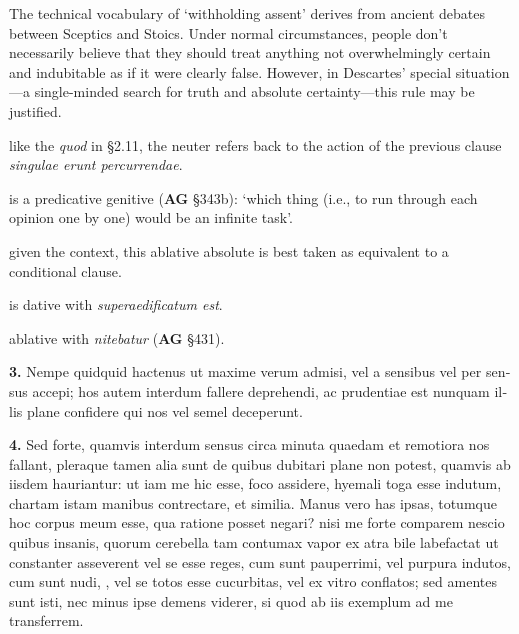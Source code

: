  The technical vocabulary of `withholding assent' derives from ancient debates between Sceptics and Stoics. Under normal circumstances, people don't necessarily believe that they should treat anything not overwhelmingly certain and indubitable as if it were clearly false. However, in Descartes' special situation---a single-minded search for truth and absolute certainty---this rule may be justified.

 like the \textit{quod} in §2.11, the neuter refers back to the action of the previous clause \textit{singulae erunt percurrendae}.

 is a predicative genitive (\textbf{AG} §343b): `which thing (i.e., to run through each opinion one by one) would be an infinite task'.

 given the context, this ablative absolute is best taken as equivalent to a conditional clause.

 is dative with \textit{superaedificatum est}.

 ablative with \textit{nitebatur} (\textbf{AG} §431).


\clearpage

\beginnumbering
\pstart
\begin{latin}
    \textenglish{\textbf{3.}} Nempe quidquid hactenus ut maxime verum admisi, vel a sensibus vel per sensus accepi; hos autem interdum fallere deprehendi, ac prudentiae est nunquam illis plane confidere qui nos vel semel deceperunt.
\end{latin}
\pend
\endnumbering

\beginnumbering
\pstart
\begin{latin}
    \textenglish{\textbf{4.}} Sed forte, quamvis interdum sensus circa minuta quaedam et remotiora nos fallant, pleraque tamen alia sunt de quibus dubitari plane non potest, quamvis ab iisdem hauriantur: ut iam me hic esse, foco assidere, hyemali toga esse indutum, chartam istam manibus contrectare, et similia. Manus vero has ipsas, totumque hoc corpus meum esse, qua ratione posset negari? nisi me forte comparem nescio quibus insanis, quorum cerebella tam contumax vapor ex atra bile labefactat ut constanter asseverent vel se esse reges, cum sunt pauperrimi, vel purpura indutos, cum sunt nudi, , vel se totos esse cucurbitas, vel ex vitro conflatos; sed amentes sunt isti, nec minus ipse demens viderer, si quod ab iis exemplum ad me transferrem.
\end{latin}
\pend
\endnumbering

